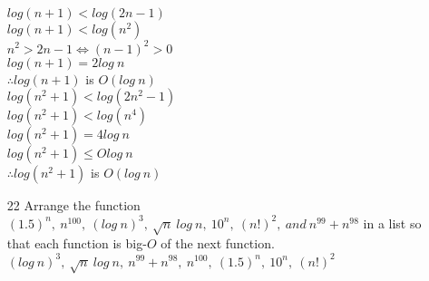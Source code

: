 \documentclass[a4paper]{article}
\newcommand\tab[1][0.5cm]{\hspace*{#1}}
\begin{document}
\begin{itemize}
    \tab $log(n + 1) < log(2n - 1)$ \\
    \tab $log(n + 1) < log(n^2)$ \\
    \tab $n^2 > 2n - 1 \Leftrightarrow (n - 1)^2 > 0$ \\
    \tab $log(n + 1) = 2log\ n$ \\
    \tab $\therefore log(n + 1)$ is $O(log\ n)$ \\
    \tab $log(n^2 + 1) < log(2n^2 - 1)$ \\
    \tab $log(n^2 + 1) < log(n^4)$ \\
    \tab $log(n^2 + 1) = 4log\ n$ \\
    \tab $log(n^2 + 1) \leq Olog\ n$ \\
    \tab $\therefore log(n^2 + 1)$ is $O(log\ n)$
    \item[22] Arrange the function $(1.5)^{n},\ n^{100},\ (log\ n)^{3},\ \sqrt{n}\ log\ n,\ 10^{n},\ (n!)^{2},\ and\ n^{99} + n^{98}$ in a list so that each function is big-$O$ of the next function. \\
    \tab $(log\ n)^{3},\ \sqrt{n}\ log\ n,\ n^{99} + n^{98},\ n^{100},\ (1.5)^{n},\ 10^{n},\ (n!)^{2}$
  \end{itemize}
\end{document}
